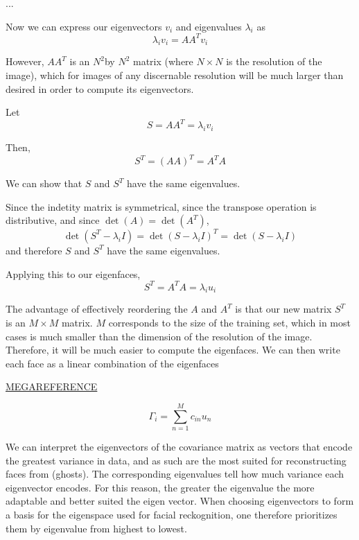 \documentclass[12pt]{extarticle}
\begin{document}
        ...
        
        Now we can express our eigenvectors $v_{i}$ and eigenvalues $\lambda _{i}$ as
            \[
                \lambda_i v_i = A A^T v_i
            \]

        However, $A A^T$ is an $N^2$by $N^2$ matrix (where $N \times N$ is the resolution of the image), which for images of any discernable resolution will be much larger than desired in order to compute its eigenvectors. 
        
        Let
            \[
                S = A A^T = \lambda_i v_i
            \]

        Then,
            \[
                S^T = (AA)^T = A^T A
            \]

        We can show that $S$ and $S^{T}$ have the same eigenvalues. 
        
        Since the indetity matrix is symmetrical, since the transpose operation is distributive, and since $\det(A) = \det\left(A^T\right)$,
            \[
                \det\left(S^T - \lambda_i I\right) = \det(S - \lambda_i I)^T = \det(S - \lambda_i I)
            \]
        and therefore $S$ and $S^T$ have the same eigenvalues.
        
        Applying this to our eigenfaces,
            \[
                S^T = A^T A = \lambda_i u_i
            \]

        The advantage of effectively reordering the $A$ and $A^T$ is that our new matrix $S^T$ is an $M \times M$ matrix. $M$ corresponds to the size of the training set, which in most cases is much smaller than the dimension of the resolution of the image. Therefore, it will be much easier to compute the eigenfaces. We can then write each face as a linear combination of the eigenfaces
        
        \href{https://datascienceplus.com/understanding-the-covariance-matrix/}{MEGAREFERENCE}
        
        \[
            \Gamma_i = \sum_{n=1}^M c_{in} u_{n}
        \]

        We can interpret the eigenvectors of the covariance matrix as vectors that encode the greatest variance in data, and as such are the most suited for reconstructing faces from (ghosts). The corresponding eigenvalues tell how much variance each eigenvector encodes. For this reason, the greater the eigenvalue the more adaptable and better suited the eigen vector. When choosing eigenvectors to form a basis for the eigenspace used for facial reckognition, one therefore prioritizes them by eigenvalue from highest to lowest.
        
\end{document}
